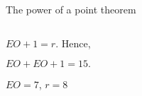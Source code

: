 \documentclass[9pt,aspectratio=169]{beamer}
\begin{document}
\begin{frame}{The power of a point theorem}
\begin{columns}[T]
\begin{column}{0.5\textwidth}
\begin{minipage}[t]{0.5\textwidth}
        $EO + 1 = r$. 
        Hence, 

        $EO + EO + 1 = 15.$

        $EO = 7$,
        $r = 8$
      \end{minipage}      
    \end{column}
  \end{columns}
\end{frame}




    
\end{document}
